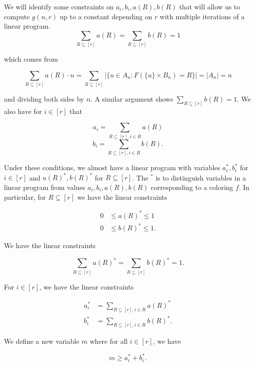 \documentclass{article}
\begin{document}
We will identify some constraints on $a_i,b_i,a(R),b(R)$ that will allow us to compute $g(n,r)$ up to a constant depending on $r$ with multiple iterations of a linear program. \\

$$\sum_{R \subseteq [r]} a(R) = \sum_{R \subseteq [r]} b(R) = 1$$

\noindent
which comes from 

$$\sum_{R \subseteq [r]} a(R) \cdot n = \sum_{R \subseteq [r]} |\{u \in A_n : F(\{u\} \times B _n) = R\}| = |A_n| = n$$

\noindent
and dividing both sides by $n$. A similar argument shows $\sum_{R \subseteq [r]} b(R) = 1$. We also have for $i \in [r]$ that

$$a_i = \sum_{R \subseteq [r], i \in R} a(R)$$
$$b_i = \sum_{R \subseteq [r], i \in R} b(R).$$

Under these conditions, we almost have a linear program with variables $a_i^*,b_i^*$ for $i \in [r]$ and $a(R)^*,b(R)^*$ for $R \subseteq [r]$. The $^*$ is to distinguish variables in a linear program from values $a_i,b_i,a(R),b(R)$ corresponding to a coloring $f$. In particular, for $R \subseteq [r]$ we have the linear constraints

\begin{equation}
\begin{split}
0 &\leq a(R)^* \leq 1 \\
0 &\leq b(R)^* \leq 1.
\end{split}
\end{equation}

\noindent
We have the linear constraints

\begin{equation} 
\sum_{R \subseteq [r]} a(R)^* = \sum_{R \subseteq [r]} b(R)^* = 1.
\end{equation}

\noindent
For $i \in [r]$, we have the linear constraints

\begin{equation}
\begin{split}
a_i^* &= \sum_{R \subseteq [r], i \in R} a(R)^* \\
b_i^* &= \sum_{R \subseteq [r], i \in R} b(R)^*.
\end{split}
\end{equation}

\noindent
We define a new variable $m$ where for all $i \in [r]$, we have 

\begin{equation}
m \geq a_i^* + b_i^*.
\end{equation}
\end{document}
